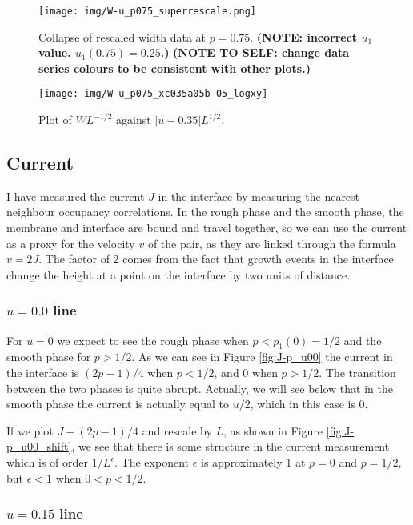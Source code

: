 \documentclass[a4paper,10pt]{article}
\newcommand{\fref}[1]{Figure \ref{#1}}
\begin{document}
\begin{figure}
 \centering
 \texttt{[image: img/W-u\_p075\_superrescale.png]}
 \caption{Collapse of rescaled width data at $p=0.75$. {\bf (NOTE: incorrect $u_1$ value. $u_1(0.75) = 0.25$.)} {\bf (NOTE TO SELF: change data series colours to be consistent with other plots.)}}
 \label{fig:W-u_p075_rs}
\end{figure}
\begin{figure}
 \centering
 \texttt{[image: img/W-u\_p075\_xc035a05b-05\_logxy]}
 \caption{Plot of $WL^{-1/2}$ against $|u-0.35|L^{1/2}$. }
 \label{fig:W-u_p075_rs_loglog}
\end{figure}

\clearpage
\subsection{Current}

I have measured the current $J$ in the interface by measuring the nearest neighbour occupancy correlations. In the rough phase and the smooth phase, the membrane and interface are bound and travel together, so we can use the current as a proxy for the velocity $v$ of the pair, as they are linked through the formula $v = 2J$. The factor of 2 comes from the fact that growth events in the interface change the height at a point on the interface by two units of distance. 

\subsubsection{$u=0.0$ line}

For $u=0$ we expect to see the rough phase when $p < p_1(0) = 1/2$ and the smooth phase for $p > 1/2$. As we can see in \fref{fig:J-p_u00} the current in the interface is $(2p-1)/4$ when $p < 1/2$, and $0$ when $p > 1/2$. The transition between the two phases is quite abrupt. Actually, we will see below that in the smooth phase the current is actually equal to $u/2$, which in this case is $0$.

If we plot $J - (2p-1)/4$ and rescale by $L$, as shown in \fref{fig:J-p_u00_shift}, we see that there is some structure in the current measurement which is of order $1/L^{\epsilon}$. The exponent $\epsilon$ is approximately $1$ at $p = 0$ and $p = 1/2$, but $\epsilon < 1$ when $0 < p < 1/2$.

\subsubsection{$u=0.15$ line}
\end{document}
